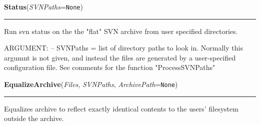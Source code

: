     \label{System:SVNOperations:Status}

    \vspace{0.5ex}

\hspace{.8\funcindent}\begin{boxedminipage}{\funcwidth}

    \raggedright \textbf{Status}(\textit{SVNPaths}={\tt None})

    \vspace{-1.5ex}

    \rule{\textwidth}{0.5\fboxrule}
\setlength{\parskip}{2ex}
    Run svn status on the the "flat" SVN archive from user specified 
    directories.

    ARGUMENT: -- SVNPaths = list of directory paths to look in.  Normally 
    this argumnt is not given, and instead the files are generated by a 
    user-specified configuration file. See comments for the function 
    "ProcessSVNPaths"

\setlength{\parskip}{1ex}
    \end{boxedminipage}

    \label{System:SVNOperations:EqualizeArchive}

    \vspace{0.5ex}

\hspace{.8\funcindent}\begin{boxedminipage}{\funcwidth}

    \raggedright \textbf{EqualizeArchive}(\textit{Files}, \textit{SVNPaths}, \textit{ArchivePath}={\tt None})

    \vspace{-1.5ex}

    \rule{\textwidth}{0.5\fboxrule}
\setlength{\parskip}{2ex}
    Equalizes archive to reflect exactly identical contents to the users' 
    filesystem outside the archive.

\setlength{\parskip}{1ex}
    \end{boxedminipage}

    \label{System:SVNOperations:EqualizeRealFiles}

